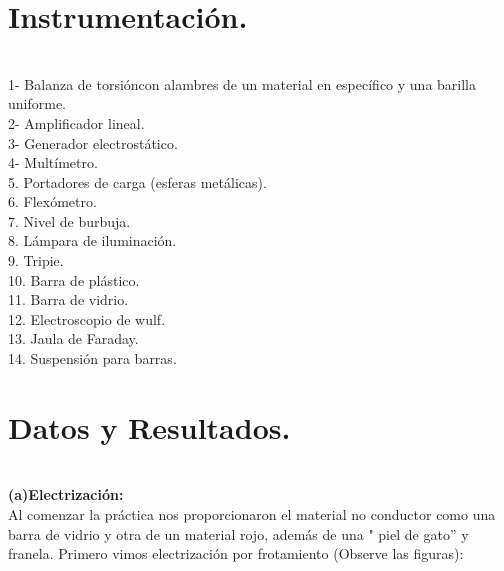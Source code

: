 \documentclass[11pt,a4paper]{article}
\begin{document}

\section{Instrumentaci\'{o}n.}\\
1- Balanza de torsi\'{o}ncon alambres de un material en espec\'{i}fico y una barilla uniforme.\\
2- Amplificador lineal.\\
3- Generador electrost\'{a}tico. \\
4- Mult\'{i}metro. \\
5. Portadores de carga (esferas met\'{a}licas).\\
6. Flex\'{o}metro.\\
7. Nivel de burbuja.\\
8. L\'{a}mpara de iluminaci\'{o}n.\\
9. Tripie.\\
10. Barra de pl\'{a}stico.\\
11. Barra de vidrio.\\
12. Electroscopio de wulf.\\
13. Jaula de Faraday.\\
14. Suspensi\'{o}n para barras.\\


\section{Datos y Resultados.}\\

\textbf{(a)Electrizaci\'{o}n:}\\
Al comenzar la pr\'{a}ctica nos proporcionaron el material no conductor como una barra de vidrio y otra de un material rojo, adem\'{a}s de una " piel de gato'' y franela. Primero vimos electrizaci\'{o}n por frotamiento (Observe las figuras):
\end{document}

